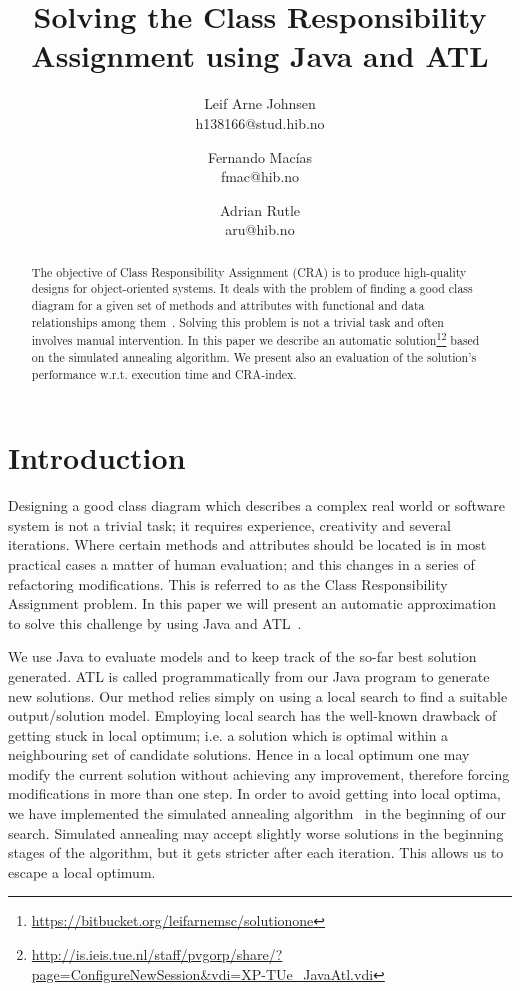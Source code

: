 \documentclass[a4paper]{article}
\title{Solving the Class Responsibility Assignment using Java and ATL}
\author{
Leif Arne Johnsen \\ h138166@stud.hib.no
\and
Fernando Macías \\ fmac@hib.no
\and
Adrian Rutle \\ aru@hib.no
}
\begin{document}
\maketitle

\begin{abstract}
The objective of Class Responsibility Assignment (CRA) is to produce high-quality designs for object-oriented systems. 
It deals with the problem of finding a good class diagram for a given set of methods and attributes with functional and data
relationships among them~\cite{BowmanBL10}.
Solving this problem is not a trivial task and often involves manual intervention.
In this paper we describe an automatic solution\footnote{\url{https://bitbucket.org/leifarnemsc/solutionone}}\footnote{\url{http://is.ieis.tue.nl/staff/pvgorp/share/?page=ConfigureNewSession\&vdi=XP-TUe_JavaAtl.vdi}} based on the simulated annealing algorithm.
We present also an evaluation of the solution's performance w.r.t. execution time and CRA-index.
\end{abstract}


\section{Introduction}

Designing a good class diagram which describes a complex real world or software system is not a trivial task; it requires experience, creativity and several iterations.
Where certain methods and attributes should be located is in most practical cases a matter of human evaluation; and this changes in a series of refactoring modifications.
This is referred to as the Class Responsibility Assignment problem.
In this paper we will present an automatic approximation to solve this challenge by using Java and ATL~\cite{ATL}.

We use Java to evaluate models and to keep track of
the so-far best solution generated.
ATL is called programmatically from our Java program to generate new solutions.
Our method relies simply on using a local search to find a suitable output/solution model.
Employing local search has the well-known drawback of getting stuck in local optimum; i.e. a solution which is optimal within a neighbouring set of candidate solutions.
Hence in a local optimum one may modify the current solution without achieving any improvement, therefore forcing modifications in more than one step.
In order to avoid getting into local optima, we have implemented the simulated annealing algorithm~\cite{Annealing} in the beginning of our search.
Simulated annealing may accept slightly worse solutions in the beginning stages of the algorithm, but it gets stricter after each iteration.
This allows us to escape a local optimum.
\end{document}

